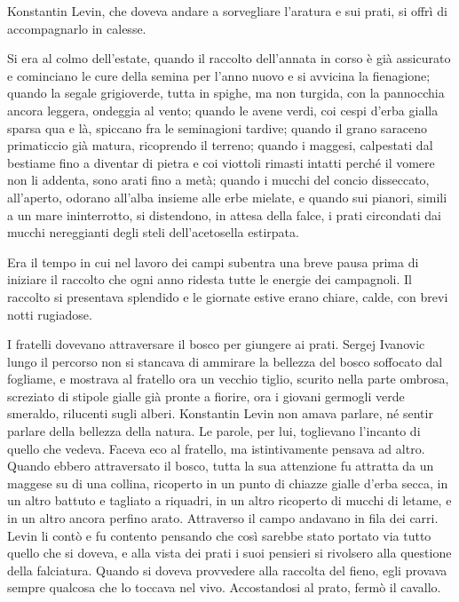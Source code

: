 Konstantin Levin, che doveva andare a sorvegliare l'aratura e sui prati, si offrì di accompagnarlo in calesse. 

Si era al colmo dell'estate, quando il raccolto dell'annata in corso è già assicurato e cominciano le cure della semina per l'anno nuovo e si avvicina la fienagione; quando la segale grigioverde, tutta in spighe, ma non turgida, con la pannocchia ancora leggera, ondeggia al vento; quando le avene verdi, coi cespi d'erba gialla sparsa qua e là, spiccano fra le seminagioni tardive; quando il grano saraceno primaticcio già matura, ricoprendo il terreno; quando i maggesi, calpestati dal bestiame fino a diventar di pietra e coi viottoli rimasti intatti perché il vomere non li addenta, sono arati fino a metà; quando i mucchi del concio disseccato, all'aperto, odorano all'alba insieme alle erbe mielate, e quando sui pianori, simili a un mare ininterrotto, si distendono, in attesa della falce, i prati circondati dai mucchi nereggianti degli steli dell'acetosella estirpata. 

Era il tempo in cui nel lavoro dei campi subentra una breve pausa prima di iniziare il raccolto che ogni anno ridesta tutte le energie dei campagnoli. Il raccolto si presentava splendido e le giornate estive erano chiare, calde, con brevi notti rugiadose. 

I fratelli dovevano attraversare il bosco per giungere ai prati. Sergej Ivanovic lungo il percorso non si stancava di ammirare la bellezza del bosco soffocato dal fogliame, e mostrava al fratello ora un vecchio tiglio, scurito nella parte ombrosa, screziato di stipole gialle già pronte a fiorire, ora i giovani germogli verde smeraldo, rilucenti sugli alberi. Konstantin Levin non amava parlare, né sentir parlare della bellezza della natura. Le parole, per lui, toglievano l'incanto di quello che vedeva. Faceva eco al fratello, ma istintivamente pensava ad altro. Quando ebbero attraversato il bosco, tutta la sua attenzione fu attratta da un maggese su di una collina, ricoperto in un punto di chiazze gialle d'erba secca, in un altro battuto e tagliato a riquadri, in un altro ricoperto di mucchi di letame, e in un altro ancora perfino arato. Attraverso il campo andavano in fila dei carri. Levin li contò e fu contento pensando che così sarebbe stato portato via tutto quello che si doveva, e alla vista dei prati i suoi pensieri si rivolsero alla questione della falciatura. Quando si doveva provvedere alla raccolta del fieno, egli provava sempre qualcosa che lo toccava nel vivo. Accostandosi al prato, fermò il cavallo. 

